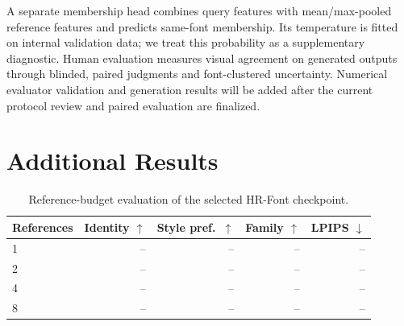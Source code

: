 \documentclass{article}
\newcommand{\method}{HR-Font\xspace}
\begin{document}
A separate membership head combines query features with mean/max-pooled reference features and predicts same-font membership.
Its temperature is fitted on internal validation data; we treat this probability as a supplementary diagnostic.
Human evaluation measures visual agreement on generated outputs through blinded, paired judgments and font-clustered uncertainty.
Numerical evaluator validation and generation results will be added after the current protocol review and paired evaluation are finalized.

\clearpage
\section{Additional Results}
\begin{table}[!ht]
\centering\small
\caption{Reference-budget evaluation of the selected \method checkpoint.}
\begin{tabular}{lrrrr}
\toprule
References & Identity $\uparrow$ & Style pref.\ $\uparrow$ & Family $\uparrow$ & LPIPS $\downarrow$\\
\midrule
1 & -- & -- & -- & --\\
2 & -- & -- & -- & --\\
4 & -- & -- & -- & --\\
8 & -- & -- & -- & --\\
\bottomrule
\end{tabular}
\end{table}
\end{document}
